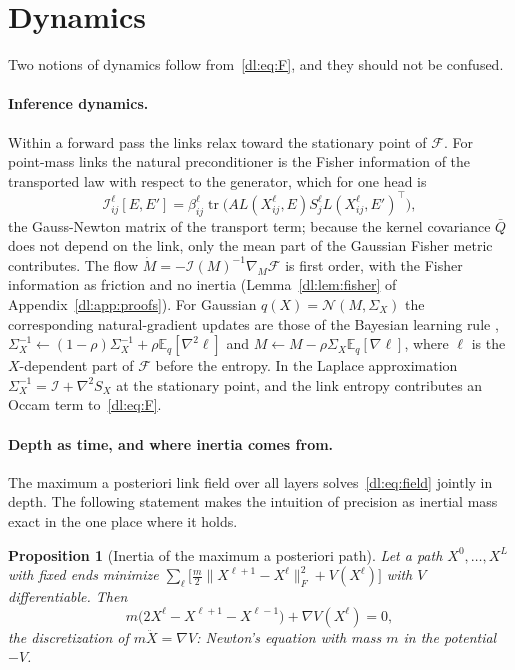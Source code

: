 \documentclass[11pt]{article}
\newtheorem{proposition}[theorem]{Proposition}
\theoremstyle{definition}
\theoremstyle{remark}
\providecommand{\tr}{\operatorname{tr}}
\newcommand{\E}{\mathbb E}
\newcommand{\N}{\mathcal N}
\newcommand{\Qb}{\bar Q}
\begin{document}
\section{Dynamics}
\label{dl:sec:dynamics}

Two notions of dynamics follow from~\eqref{dl:eq:F}, and they should not be confused.

\paragraph{Inference dynamics.} Within a forward pass the links relax toward the stationary point of $\mathcal F$. For point-mass links the natural preconditioner is the Fisher information of the transported law with respect to the generator, which for one head is
\begin{equation}
\mathcal I_{ij}^\ell[E,E']=\beta_{ij}^\ell\tr\big(AL(X_{ij}^\ell,E)S_j^\ell L(X_{ij}^\ell,E')^\top\big),
\label{dl:eq:fisher}
\end{equation}
the Gauss-Newton matrix of the transport term; because the kernel covariance $\Qb$ does not depend on the link, only the mean part of the Gaussian Fisher metric contributes. The flow $\dot M=-\mathcal I(M)^{-1}\nabla_M\mathcal F$ is first order, with the Fisher information as friction and no inertia (Lemma~\ref{dl:lem:fisher} of Appendix~\ref{dl:app:proofs}). For Gaussian $q(X)=\N(M,\Sigma_X)$ the corresponding natural-gradient updates are those of the Bayesian learning rule \cite{dl:khan2023}, $\Sigma_X^{-1}\leftarrow(1-\rho)\Sigma_X^{-1}+\rho\E_q[\nabla^2\ell]$ and $M\leftarrow M-\rho\Sigma_X\E_q[\nabla\ell]$, where $\ell$ is the $X$-dependent part of $\mathcal F$ before the entropy. In the Laplace approximation $\Sigma_X^{-1}=\mathcal I+\nabla^2S_X$ at the stationary point, and the link entropy contributes an Occam term to~\eqref{dl:eq:F}.

\paragraph{Depth as time, and where inertia comes from.} The maximum a posteriori link field over all layers solves~\eqref{dl:eq:field} jointly in depth. The following statement makes the intuition of precision as inertial mass exact in the one place where it holds.

\begin{proposition}[Inertia of the maximum a posteriori path]
\label{dl:prop:inertia}
Let a path $X^0,\dots,X^L$ with fixed ends minimize $\sum_\ell\big[\tfrac m2\|X^{\ell+1}-X^\ell\|_F^2+V(X^\ell)\big]$ with $V$ differentiable. Then
\begin{equation}
m\big(2X^\ell-X^{\ell+1}-X^{\ell-1}\big)+\nabla V(X^\ell)=0,
\label{dl:eq:inertia}
\end{equation}
the discretization of $m\ddot X=\nabla V$: Newton's equation with mass $m$ in the potential $-V$.
\end{proposition}
\end{document}

